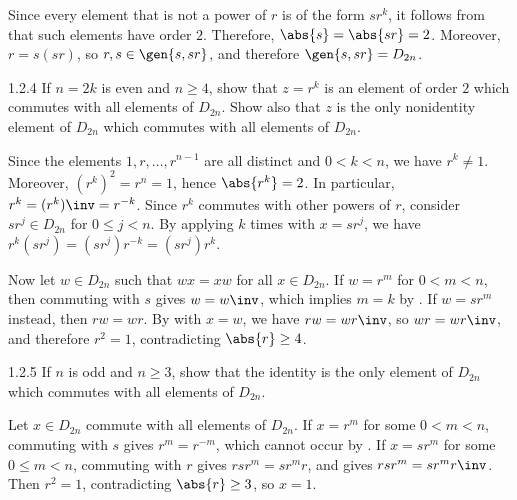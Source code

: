 \begin{sol}
    Since every element that is not a power of $r$ is of the form $s r^k$, it follows from  that such elements have order $2$.
    Therefore, $\abs{s} = \abs{sr} = 2$.
	Moreover, $r = s(sr)$, so $r, s \in \gen{s, s r}$, and therefore $\gen{s, sr} = D_{2n}$.
\end{sol}

\begin{exercise}{1.2.4}
    If $n = 2k$ is even and $n \geq 4$, show that $z = r^k$ is an element of order $2$ which commutes with all elements of $D_{2n}$.
	Show also that $z$ is the only nonidentity element of $D_{2n}$ which commutes with all elements of $D_{2n}$.
\end{exercise}
   
\begin{sol}
    Since the elements $1, r, \ldots, r^{n-1}$ are all distinct and $0 < k < n$, we have $r^k \neq 1$.
	Moreover, $(r^k)^2 = r^n = 1$, hence $\abs{r^k} = 2$.
    In particular, $r^k = (r^k)\inv = r^{-k}$.
	Since $r^k$ commutes with other powers of $r$, consider $sr^j \in D_{2n}$ for $0 \leq j < n$.
	By applying  $k$ times with $x = s r^j$, we have $r^k (s r^j) = (s r^j) r^{-k} = (s r^j) r^k$.

    Now let $w \in D_{2n}$ such that $wx = xw$ for all $x \in D_{2n}$.
	If $w = r^m$ for $0 < m < n$, then commuting with $s$ gives $w = w\inv$, which implies $m = k$ by .
	If $w = sr^m$ instead, then $r w = w r$.
    By  with $x = w$, we have $r w = w r\inv$, so $w r = w r\inv$, and therefore $r^2 = 1$, contradicting $\abs{r} \geq 4$.
\end{sol}

\begin{exercise}{1.2.5}
    If $n$ is odd and $n \geq 3$, show that the identity is the only element of $D_{2n}$ which commutes with all elements of $D_{2n}$.
\end{exercise}

\begin{sol}
    Let $x \in D_{2n}$ commute with all elements of $D_{2n}$.
    If $x = r^m$ for some $0 < m < n$, commuting with $s$ gives $r^m = r^{-m}$, which cannot occur by .
    If $x = s r^m$ for some $0 \leq m < n$, commuting with $r$ gives $r s r^m = s r^m r$, and  gives $r s r^m = s r^m r\inv$.
    Then $r^2 = 1$, contradicting $\abs{r} \geq 3$, so $x = 1$.
\end{sol}

